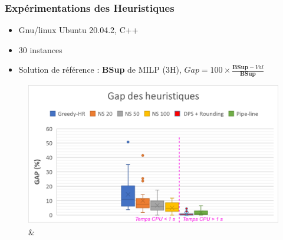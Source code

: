 \documentclass[hyperref={bookmarks=false},aspectratio=169]{beamer}
\begin{document}
\begin{frame}
\frametitle{Expérimentations des Heuristiques}%
\addtocounter{framenumber}{-1}
\begin{itemize}
\item Gnu/linux Ubuntu 20.04.2, C++
\item 30 instances
\item Solution de référence : \textbf{BSup} de MILP (3H), $Gap=100 \times \frac{\textbf{BSup}-Val}{\textbf{BSup}}$
\end{itemize}
\begin{figure}[H]
	\centering
		\includegraphics[width=11.5cm]{figures/separateur_slide_Gap_Heuristiques_INST_VAR.pdf}&%
\end{figure}
\end{frame}

\end{document}
